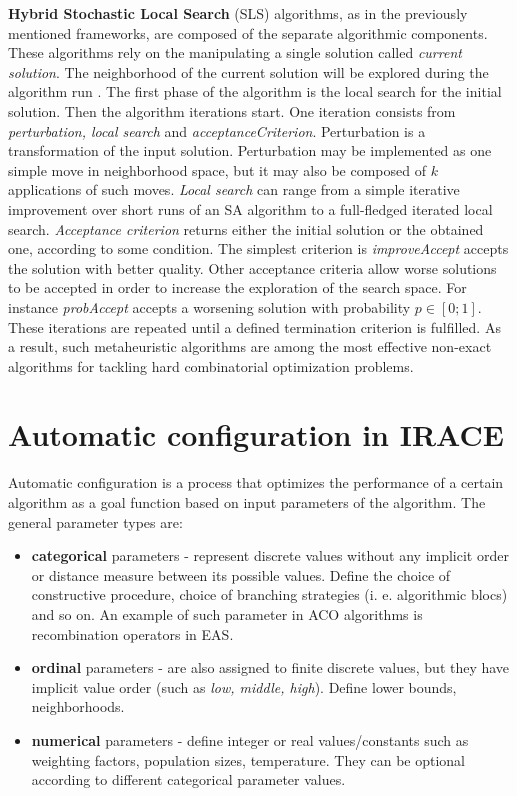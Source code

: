 \documentclass[12pt]{article}
\begin{document}
\textbf{Hybrid Stochastic Local Search} (SLS) algorithms, as in the previously mentioned frameworks, are composed of the separate algorithmic components. These algorithms rely on the manipulating a single solution called \emph{current solution}. The neighborhood of the current solution will be explored during the algorithm run \cite{hsls}. The first phase of the algorithm is the local search for the initial solution. Then the algorithm iterations start. One iteration consists from \emph{perturbation, local search} and \emph{acceptanceCriterion}. Perturbation is a transformation of the input solution. Perturbation may be implemented as one simple move in neighborhood space, but it may also be composed of $k$ applications of such moves. \emph{Local search} can range from a simple iterative improvement over short runs of an SA algorithm to a full-fledged iterated local search. \emph{Acceptance criterion} returns either the initial solution or the obtained one, according to some condition. The simplest criterion is \emph{improveAccept} accepts the solution with better quality. Other acceptance criteria allow worse solutions to be accepted in order to increase the exploration of the search space. For instance \emph{probAccept} accepts a worsening solution with probability $p \in [0;1]$. These iterations are repeated until a defined termination criterion is fulfilled. As a result, such metaheuristic algorithms are among the most effective non-exact algorithms for tackling hard combinatorial optimization problems.


\section{Automatic configuration in IRACE}

Automatic configuration is a process that optimizes the performance of a certain algorithm as a goal function based on input parameters of the algorithm. The general parameter types are:
 
\begin{itemize}
\item \textbf{categorical} parameters - represent discrete values without any implicit order or distance measure between its possible values. Define the choice of constructive procedure, choice of branching strategies (i. e. algorithmic blocs) and so on. An example of such parameter in ACO algorithms is recombination operators in EAS.
\item \textbf{ordinal} parameters - are also assigned to finite discrete values, but they have implicit value order (such as \emph{low, middle, high}). Define lower bounds, neighborhoods.
\item \textbf{numerical} parameters - define integer or real values/constants such as weighting factors, population sizes, temperature. They can be optional according to different categorical parameter values.
\end{itemize}
\end{document}
